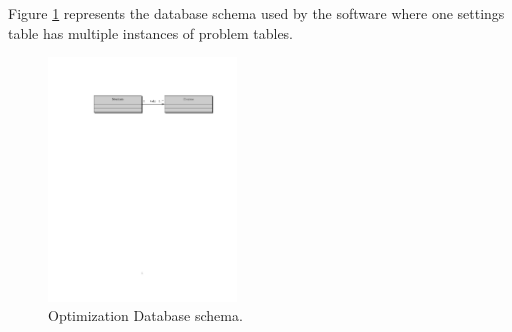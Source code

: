 Figure \ref{fig:database schema} represents the database schema used by the software where one settings table has multiple instances of problem tables. 


\begin{figure}[!h]
    \centering
    \includegraphics[width=5cm]{chapters/chapter_3_Software/database_schema.pdf}
    \caption{Optimization Database schema.}
    \label{fig:database schema}
\end{figure}




